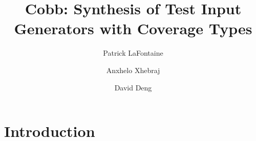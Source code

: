 \documentclass[review, sigplan]{acmart}
\begin{document}
\title{Cobb: Synthesis of Test Input Generators with Coverage Types}

\author{Patrick LaFontaine}
\author{Anxhelo Xhebraj}
\author{David Deng}


\renewcommand{\shortauthors}{LaFontaine et al.}

\newcommand\todo[1]{\textcolor{red}{#1}}









\maketitle

\section{Introduction}
\end{document}
